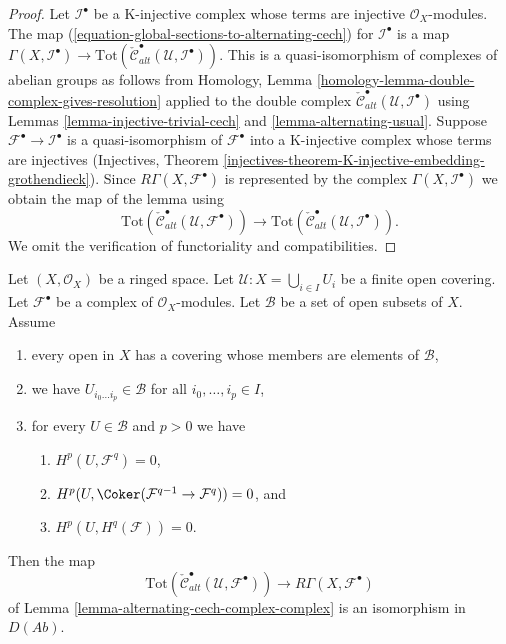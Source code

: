 \begin{proof}
Let ${\mathcal I}^\bullet$ be a K-injective complex whose terms
are injective $\mathcal{O}_X$-modules.
The map (\ref{equation-global-sections-to-alternating-cech}) for
$\mathcal{I}^\bullet$ is a map
$\Gamma(X, {\mathcal I}^\bullet) \to
\text{Tot}(\check{\mathcal{C}}^\bullet_{alt}({\mathcal U},
{\mathcal I}^\bullet))$.
This is a quasi-isomorphism of complexes of abelian groups
as follows from
Homology, Lemma \ref{homology-lemma-double-complex-gives-resolution}
applied to the double complex
$\check{\mathcal{C}}^\bullet_{alt}({\mathcal U},
{\mathcal I}^\bullet)$ using
Lemmas \ref{lemma-injective-trivial-cech} and \ref{lemma-alternating-usual}.
Suppose ${\mathcal F}^\bullet \to {\mathcal I}^\bullet$ is a quasi-isomorphism
of ${\mathcal F}^\bullet$ into a K-injective complex whose terms
are injectives (Injectives, Theorem
\ref{injectives-theorem-K-injective-embedding-grothendieck}).
Since $R\Gamma(X, {\mathcal F}^\bullet)$ is represented by the complex
$\Gamma(X, {\mathcal I}^\bullet)$ we obtain the map of the lemma
using
$$
\text{Tot}(\check{\mathcal{C}}^\bullet_{alt}({\mathcal U},
{\mathcal F}^\bullet))
\longrightarrow
\text{Tot}(\check{\mathcal{C}}^\bullet_{alt}({\mathcal U},
{\mathcal I}^\bullet)).
$$
We omit the verification of functoriality and compatibilities.
\end{proof}

\begin{lemma}
\label{lemma-alternating-cech-complex-complex-ss}
Let $(X, \mathcal{O}_X)$ be a ringed space. Let
$\mathcal{U} : X = \bigcup_{i \in I} U_i$ be a finite open covering. Let
$\mathcal{F}^\bullet$ be a complex of $\mathcal{O}_X$-modules.
Let $\mathcal{B}$ be a set of open subsets of $X$. Assume
\begin{enumerate}
\item every open in $X$ has a covering whose members are
elements of $\mathcal{B}$,
\item we have $U_{i_0\ldots i_p} \in \mathcal{B}$ for all
$i_0, \ldots, i_p \in I$,
\item for every $U \in \mathcal{B}$ and $p > 0$ we have
\begin{enumerate}
\item $H^p(U, \mathcal{F}^q) = 0$,
\item $H^p(U, \Coker(\mathcal{F}^{q - 1} \to \mathcal{F}^q)) = 0$, and
\item $H^p(U, H^q(\mathcal{F})) = 0$.
\end{enumerate}
\end{enumerate}
Then the map
$$
\text{Tot}(\check{\mathcal{C}}^\bullet_{alt}(\mathcal{U}, \mathcal{F}^\bullet))
\longrightarrow
R\Gamma(X, \mathcal{F}^\bullet)
$$
of Lemma \ref{lemma-alternating-cech-complex-complex}
is an isomorphism in $D(\textit{Ab})$.
\end{lemma}

